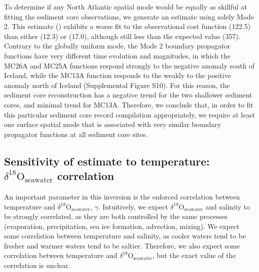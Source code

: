 \documentclass[draft]{agujournal2019}
\begin{document}
To determine if any North Atlantic spatial mode would be equally as
skillful at fitting the sediment core observations, we generate an
estimate using solely Mode 2.
This estimate () exhibits a worse fit to the observational
cost function (122.5) than either  (12.3) or  (17.0), although still less than the expected value (357).
Contrary to the globally uniform mode, the Mode 2 boundary propagator
functions have very different time evolution and magnitudes, in which the MC26A and
MC25A functions respond strongly to the negative anomaly south of Iceland, while the
MC13A function responds to the weakly to the positive anomaly north of Iceland
(Supplemental Figure S10). 
For this reason, the
sediment core reconstruction has a negative trend for the two
shallower sediment cores, and minimal trend for MC13A.
Therefore, we conclude that, in order to fit this particular sediment core record
compilation appropriately,
we require at least one surface spatial mode that is associated with very similar
boundary propagator functions at all sediment core sites.

\subsection{Sensitivity of estimate to temperature:$\delta^{18}\mathrm{O}_{\mathrm{seawater}}$ correlation \label{sec:gammasens}}
An important parameter in this inversion is the
enforced correlation between temperature and
$\delta^{18}\mathrm{O}_{\mathrm{seawater}}$, $\gamma$. Intuitively, we expect
$\delta^{18}\mathrm{O}_{\mathrm{seawater}}$ and salinity to be strongly
correlated, as they are both controlled by the same processes
(evaporation, precipitation, sea ice formation, advection, mixing).
We expect some correlation between
temperature and salinity, as cooler waters tend to be fresher and
warmer waters tend to be saltier. Therefore, we also expect some
correlation between temperature and
$\delta^{18}\mathrm{O}_{\mathrm{seawater}}$, but the exact value of the
correlation is unclear.
\end{document}

